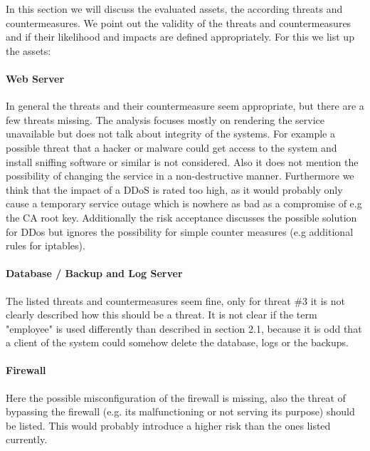 \documentclass[english]{article}
\begin{document}
%
%
In this section we will discuss the evaluated assets, the according threats and countermeasures. We point out the validity of the threats and countermeasures and if their likelihood and impacts are defined appropriately. For this we list up the assets:

\paragraph{Web Server}
In general the threats and their countermeasure seem appropriate, but there are a few threats missing. The analysis focuses mostly on rendering the service unavailable but does not talk about integrity of the systems. For example a possible threat that a hacker or malware could get access to the system and install sniffing software or similar is not considered. Also it does not mention the possibility of changing the service in a non-destructive manner.
Furthermore we think that the impact of a DDoS is rated too high, as it would probably only cause a temporary service outage which is nowhere as bad as a compromise of e.g the CA root key. Additionally the risk acceptance discusses the possible solution for DDos but ignores the possibility for simple counter measures (e.g additional rules for iptables).

\paragraph{Database / Backup and Log Server}
The listed threats and countermeasures seem fine, only for threat \#3 it is not clearly described how this should be a threat. It is not clear if the term "employee" is used differently than described in section 2.1, because it is odd that a client of the system could somehow delete the database, logs or the backups.

\paragraph{Firewall}   
Here the possible misconfiguration of the firewall is missing, also the threat of bypassing the firewall (e.g. its malfunctioning or not serving its purpose) should be listed. This would probably introduce a higher risk than the ones listed currently.\\
\end{document}
